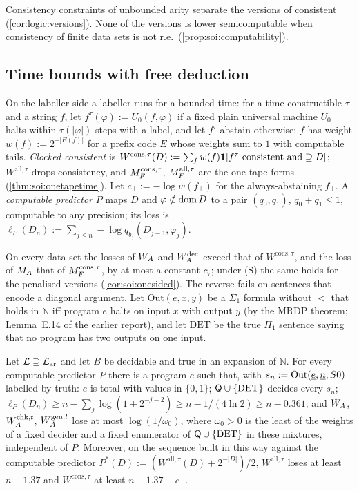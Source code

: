 Consistency constraints of unbounded arity separate the versions of consistent \SOIabbr (\cref{cor:logic:versions}). None of the versions is lower semicomputable when consistency of finite data sets is not r.e.\ (\cref{prop:soi:computability}).

\subsection{Time bounds with free deduction}\label{sec:soi:time}

On the labeller side a labeller runs for a bounded time: for a time-constructible $\tau$ and a string $f$, let $f^\tau(\varphi):=U_0(f,\varphi)$ if a fixed plain universal machine $U_0$ halts within $\tau(\lvert\varphi\rvert)$ steps with a label, and let $f^\tau$ abstain otherwise; $f$ has weight $w(f):=2^{-\lvert E(f)\rvert}$ for a prefix code $E$ whose weights sum to $1$ with computable tails. \emph{Clocked consistent} \SOIabbr is $W^{\mathrm{cons},\tau}(D):=\sum_fw(f)\mathbf{1}[f^\tau\text{ consistent and}\supseteq D]$; $W^{\mathrm{all},\tau}$ drops consistency, and $M_{F}^{\mathrm{cons},\tau}$, $M_{F}^{\mathrm{all},\tau}$ are the one-tape forms (\cref{thm:soi:onetapetime}). Let $c_\bot:=-\log w(f_\bot)$ for the always-abstaining $f_\bot$. A \emph{computable predictor} $P$ maps $D$ and $\varphi\notin\operatorname{dom} D$ to a pair $(q_0,q_1)$, $q_0+q_1\le1$, computable to any precision; its loss is $\ell_P(D_n):=\sum_{j\le n}-\log q_{b_j}(D_{j-1},\varphi_j)$.

On every data set the losses of $W_{A}$ and $W_{A}^{\mathrm{dec}}$ exceed that of $W^{\mathrm{cons},\tau}$, and the loss of $M_{A}$ that of $M_{F}^{\mathrm{cons},\tau}$, by at most a constant $c_\tau$; under (S) the same holds for the penalised versions (\cref{cor:soi:onesided}). The reverse fails on sentences that encode a diagonal argument. Let $\mathrm{Out}(e,x,y)$ be a $\Sigma_1$ formula without $<$ that holds in $\mathbb N$ iff program $e$ halts on input $x$ with output $y$ (by the MRDP theorem; Lemma~E.14 of the earlier report), and let $\mathrm{DET}$ be the true $\Pi_1$ sentence saying that no program has two outputs on one input.

\begin{theorem}\label{thm:soi:diagonal}
Let $\mathcal L\supseteq\mathcal{L}_{\mathrm{ar}}$ and let $B$ be decidable and true in an expansion of $\mathbb N$. For every computable predictor $P$ there is a program $e$ such that, with $s_n:=\mathrm{Out}(\underline{e},\underline{n},S0)$ labelled by truth: $e$ is total with values in $\{0,1\}$; $\mathsf{Q}\cup\{\mathrm{DET}\}$ decides every $s_n$; $\ell_P(D_n)\ge n-\sum_j\log(1+2^{-j-2})\ge n-1/(4\ln2)\ge n-0.361$; and $W_{A}$, $W_{A}^{\mathrm{chk},t}$, $W_{A}^{\mathrm{gen},t}$ lose at most $\log(1/\omega_0)$, where $\omega_0>0$ is the least of the weights of a fixed decider and a fixed enumerator of $\mathsf{Q}\cup\{\mathrm{DET}\}$ in these mixtures, independent of $P$. Moreover, on the sequence built in this way against the computable predictor $P^\ast(D):=(W^{\mathrm{all},\tau}(D)+2^{-\lvert D\rvert})/2$, $W^{\mathrm{all},\tau}$ loses at least $n-1.37$ and $W^{\mathrm{cons},\tau}$ at least $n-1.37-c_\bot$.
\end{theorem}

